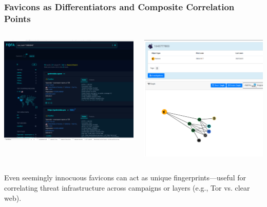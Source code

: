 \documentclass[10pt,aspectratio=169, colorlinks=true, linkcolor=circlBlue]{beamer}
\begin{document}
\begin{frame}
    \frametitle{Favicons as Differentiators and Composite Correlation Points}
    \begin{columns}
        \begin{column}{0.5\textwidth}
            \includegraphics[scale=0.15]{./img/favicon-fofa.png}
        \end{column}
        \begin{column}{0.5\textwidth}
            \includegraphics[scale=0.15]{./img/favicon-2.png}
        \end{column}
    \end{columns}
    \vspace{0.5em}
    \begin{center}
        {\small Even seemingly innocuous favicons can act as unique fingerprints—useful for correlating threat infrastructure across campaigns or layers (e.g., Tor vs. clear web).}
    \end{center}
\end{frame}
\end{document}
